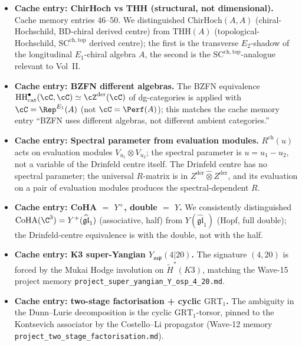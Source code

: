\begin{itemize}
\item \textbf{Cache entry: ChirHoch vs THH (structural, not dimensional).}
Cache memory entries 46--50.  We distinguished
$\mathrm{ChirHoch}(A, A)$ (chiral-Hochschild, BD-chiral derived centre)
from $\mathrm{THH}(A)$ (topological-Hochschild, $\mathrm{SC}^{\mathrm{ch,
top}}$ derived centre); the first is the transverse $E_2$-shadow of the
longitudinal $E_1$-chiral algebra $A$, the second is the $\mathrm{SC}^{
\mathrm{ch, top}}$-analogue relevant to Vol~II.

\item \textbf{Cache entry: BZFN different algebras.}  The BZFN
equivalence $\mathrm{HH}^\bullet_{\mathrm{cat}}(\cC, \cC) \simeq
\cZ^{\mathrm{der}}(\cC)$ of dg-categories is applied with $\cC =
\Rep^{E_1}(A)$ (not $\cC = \Perf(A)$); this matches the cache memory
entry ``BZFN uses different algebras, not different ambient
categories.''

\item \textbf{Cache entry: Spectral parameter from evaluation modules.}
$R^{\mathrm{ch}}(u)$ acts on evaluation modules $V_{u_1} \otimes
V_{u_2}$; the spectral parameter is $u = u_1 - u_2$, not a variable of
the Drinfeld centre itself.  The Drinfeld centre has no spectral
parameter; the universal $R$-matrix is in
$Z^{\mathrm{der}} \widehat\otimes Z^{\mathrm{der}}$, and its evaluation
on a pair of evaluation modules produces the spectral-dependent $R$.

\item \textbf{Cache entry: CoHA $=$ $Y^+$, double $=$ $Y$.}  We
consistently distinguished $\mathrm{CoHA}(\C^3) = Y^+(\widehat{\mathfrak
{gl}}_1)$ (associative, half) from $Y(\widehat{\mathfrak{gl}}_1)$
(Hopf, full double); the Drinfeld-centre equivalence is with the
double, not with the half.

\item \textbf{Cache entry: K3 super-Yangian $Y_{\mathfrak{osp}}(4|20)$.}
The signature $(4, 20)$ is forced by the Mukai Hodge involution on
$\widetilde H^*(K3)$, matching the Wave-15 project memory
\texttt{project\_super\_yangian\_Y\_osp\_4\_20.md}.

\item \textbf{Cache entry: two-stage factorisation + cyclic
$\mathrm{GRT}_1$.}  The ambiguity in the Dunn--Lurie decomposition is
the cyclic $\mathrm{GRT}_1$-torsor, pinned to the Kontsevich associator
by the Costello--Li propagator (Wave-12 memory
\texttt{project\_two\_stage\_factorisation.md}).


\end{itemize}
